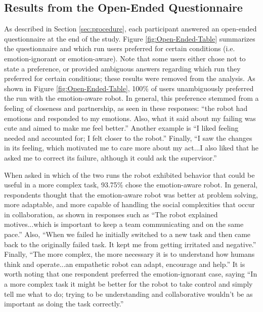 \documentclass[12pt]{report}
\begin{document}
\subsection{Results from the Open-Ended Questionnaire} 
\label{sec:Open-Ended}
As described in Section \ref{sec:procedure}, each participant answered an open-ended
questionnaire at the end of the study. Figure \ref{fig:Open-Ended-Table}
summarizes the questionnaire and which run users preferred for certain
conditions (i.e. emotion-ignorant or emotion-aware). Note that some users either
chose not to state a preference, or provided ambiguous answers regarding which
run they preferred for certain conditions; these results were removed from the analysis.
As shown in Figure \ref{fig:Open-Ended-Table}, 100\% of users unambiguously
preferred the run with the emotion-aware robot. In general, this preference
stemmed from a feeling of closeness and partnership, as seen in these responses:
``the robot had emotions and responded to my emotions. Also, what it said about
my failing was cute and aimed to make me feel better.'' Another example is ``I
liked feeling needed and accounted for; I felt closer to the robot.'' Finally,
``I saw the changes in its feeling, which motivated me to care more about my
act...I also liked that he asked me to correct its failure, although it could
ask the supervisor.''  

When asked in which of the two runs the robot exhibited
behavior that could be useful in a more complex task, 93.75\% chose the
emotion-aware robot. In general, respondents thought that the emotion-aware
robot was better at problem solving, more adaptable, and more capable of
handling the social complexities that occur in collaboration, as shown in
responses such as ``The robot explained motives...which is important to keep a
team communicating and on the same pace.'' Also, ``When we failed he initially
switched to a new task and then came back to the originally failed task. It kept
me from getting irritated and negative.'' Finally, ``The more complex, the more
necessary it is to understand how humans think and operate...an empathetic robot
can adapt, encourage and help.'' It is worth noting that one respondent
preferred the emotion-ignorant case, saying ``In a more complex task it might be
better for the robot to take control and simply tell me what to do; trying to be
understanding and collaborative wouldn't be as important as doing the task
correctly.''
\end{document}
